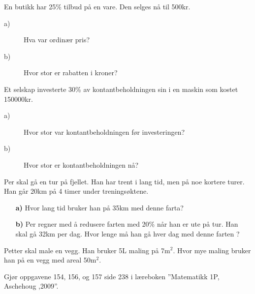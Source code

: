 \documentclass[a4, 11pt, twoside]{article}
\theoremstyle{definition}
\begin{document}
\begin{Exercise}
  En butikk har 25\% tilbud på en vare. Den selges nå til 500kr.
\begin{description}
\item[a)] Hva var ordinær pris?
\item[b)] Hvor stor er rabatten i kroner?
\end{description}
\end{Exercise}

\begin{Exercise}
  Et selskap investerte 30\% av kontantbeholdningen sin i en maskin
  som kostet 150000kr.
  \begin{description}
    \item[a)] Hvor stor var kontantbeholdningen før investeringen?
    \item[b)] Hvor stor er kontantbeholdningen nå?
  \end{description}
\end{Exercise}


\begin{Exercise}
Per skal gå en tur på fjellet. Han har trent i lang tid, men på noe
kortere turer. Han går 20km på 4 timer under treningsøktene.
\begin{itemize}
\item[\bf a)] Hvor lang tid bruker han på 35km med denne farta?
\item[\bf b)] Per regner med å redusere farten med 20\% når han er ute på
    tur. Han skal gå 32km per dag. Hvor lenge må han gå hver dag med denne
        farten ?
\end{itemize}
\end{Exercise}


\begin{Exercise}
Petter skal male en vegg. Han bruker 5L maling på 7m$^2$. Hvor mye
maling bruker han på en vegg med areal 50m$^2$.
\end{Exercise}

\begin{Exercise}
Gjør oppgavene 154, 156, og 157 side 238 i læreboken ''Matematikk 1P, Aschehoug ,2009''.
\end{Exercise}
\end{document}
